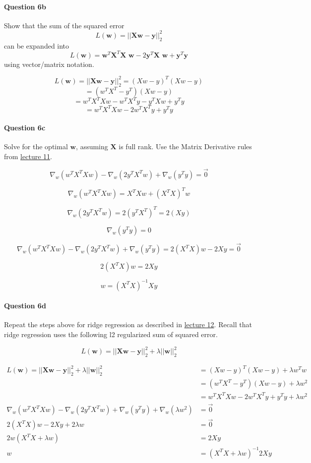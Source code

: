 \documentclass[11pt]{article}
\begin{document}
\paragraph{Question 6b}\label{question-6b}

Show that the sum of the squared error
\[L(\textbf{w}) = ||\textbf{Xw}-\textbf{y}||_2^2\] can be expanded into
\[L(\textbf{w}) = \textbf{w}^T \textbf{X}^T \textbf{X w} - 2 \textbf{y}^T \textbf{X w} + \textbf{y}^T \textbf{y}\]
using vector/matrix notation.

    \[L(\textbf{w}) = ||\textbf{Xw}-\textbf{y}||_2^2 = (Xw - y)^T (Xw-y) \]
\[ = (w^T X^T - y^T) (Xw-y) \]
\[ = w^T X^T Xw - w^T X^T y - y^T Xw + y^T y \]
\[ = w^T X^T Xw - 2w^T X^T y + y^T y \]

    \paragraph{Question 6c}\label{question-6c}

Solve for the optimal \(\textbf{w}\), assuming \(\textbf{X}\) is full
rank. Use the Matrix Derivative rules from
\href{http://www.ds100.org/fa18/syllabus\#lecture-week-6}{lecture 11}.

    \[\nabla_w (w^T X^T X w) - \nabla_w(2y^TX^T w) + \nabla_w(y^T y) = \vec{0}\]

\[ \nabla_w (w^T X^T X w) = X^T X w + (X^T X)^T w \]

\[ \nabla_w(2y^TX^T w) = 2(y^T X^T)^T = 2(Xy) \]

\[ \nabla_w(y^T y) = 0 \]

\[\nabla_w (w^T X^T X w) - \nabla_w(2y^TX^T w) + \nabla_w(y^T y) = 2(X^T X) w - 2Xy = \vec{0}\]

\[ 2(X^T X) w = 2Xy \]

\[ w = (X^T X)^{-1} Xy \]

    \paragraph{Question 6d}\label{question-6d}

Repeat the steps above for ridge regression as described in
\href{http://www.ds100.org/fa18/syllabus\#lecture-week-6}{lecture 12}.
Recall that ridge regression uses the following l2 regularized sum of
squared error.

\[L(\textbf{w}) = ||\textbf{X}\textbf{w} - \textbf{y}||_2^2 + \lambda ||\textbf{w}||_2^2\]

    \[
\begin{aligned}
L(\textbf{w}) = ||\textbf{X}\textbf{w} - \textbf{y}||_2^2 + \lambda ||\textbf{w}||_2^2 &= (Xw - y)^T (Xw-y) + \lambda w^Tw \\
&= (w^T X^T - y^T) (Xw-y) + \lambda w^2 \\
&= w^T X^T Xw - 2w^T X^T y + y^T y + \lambda w^2 \\
\nabla_w (w^T X^T X w) - \nabla_w(2y^TX^T w) + \nabla_w(y^T y) + \nabla_w(\lambda w^2) &= \vec{0} \\
2(X^T X) w - 2Xy + 2\lambda w &= \vec{0} \\
2w(X^T X + \lambda w) &= 2Xy \\
w &= (X^T X + \lambda w)^{-1} 2Xy
\end{aligned}
\]
\end{document}
